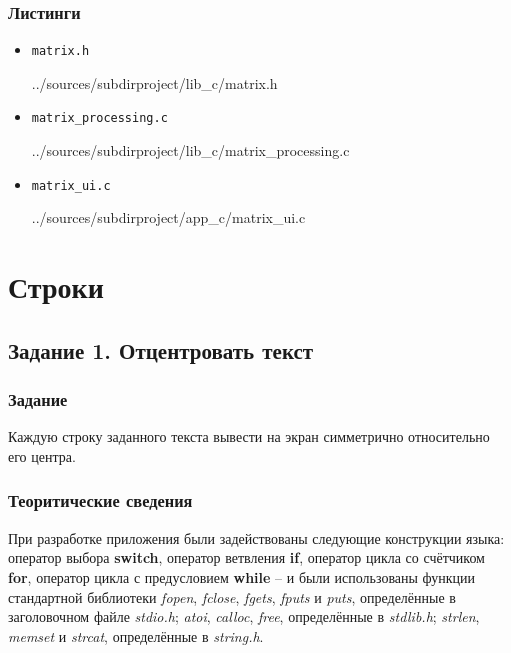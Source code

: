 \documentclass[12pt,a4paper]{report}
\begin{document}
\subsection*{Листинги}
\begin{itemize}
\item[] \verb-matrix.h-

{../sources/subdirproject/lib_c/matrix.h}
\item[] \verb-matrix_processing.c-

{../sources/subdirproject/lib_c/matrix_processing.c}
\item[] \verb-matrix_ui.c-

{../sources/subdirproject/app_c/matrix_ui.c}
\end{itemize}


%
\chapter{Строки}
\section{Задание 1. Отцентровать текст}
\subsection{Задание}
\hspace{\parindent}
Каждую строку заданного текста вывести на экран симметрично относительно его центра.
\subsection{Теоритические сведения}
\hspace{\parindent}
При разработке приложения были задействованы следующие конструкции языка: оператор выбора \textbf{switch}, оператор ветвления \textbf{if}, оператор цикла со счётчиком \textbf{for}, оператор цикла с предусловием \textbf{while} -- и были использованы функции стандартной библиотеки \textit{fopen}, \textit{fclose}, \textit{fgets}, \textit{fputs} и \textit{puts}, определённые в заголовочном файле \textit{stdio.h}; \textit{atoi}, \textit{calloc}, \textit{free}, определённые в \textit{stdlib.h}; \textit{strlen}, \textit{memset} и \textit{strcat}, определённые в \textit{string.h}.
\end{document}

